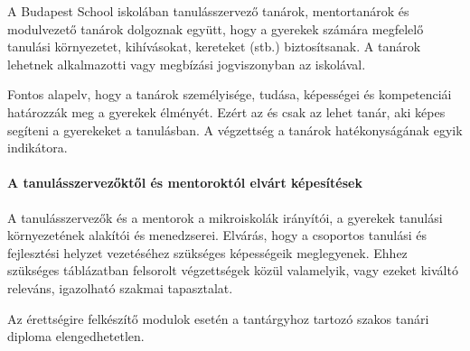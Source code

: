 A Budapest School iskolában tanulásszervező tanárok, mentortanárok és modulvezető tanárok dolgoznak együtt, hogy a gyerekek számára megfelelő tanulási környezetet, kihívásokat, kereteket (stb.) biztosítsanak. A tanárok lehetnek alkalmazotti vagy megbízási jogviszonyban az iskolával.

Fontos alapelv, hogy a tanárok személyisége, tudása, képességei és kompetenciái határozzák meg a gyerekek élményét.  Ezért az és csak az lehet tanár, aki képes segíteni a gyerekeket a tanulásban. A végzettség a tanárok hatékonyságának egyik indikátora.

\paragraph{A tanulásszervezőktől és mentoroktól elvárt képesítések} A
tanulásszervezők és a mentorok a mikroiskolák irányítói, a gyerekek tanulási környezetének alakítói és menedzserei. Elvárás, hogy a csoportos tanulási és fejlesztési helyzet vezetéséhez szükséges képességeik meglegyenek. Ehhez szükséges  táblázatban felsorolt végzettségek közül valamelyik, vagy ezeket kiváltó releváns, igazolható szakmai tapasztalat.

Az érettségire felkészítő modulok esetén a tantárgyhoz tartozó szakos tanári diploma elengedhetetlen.


